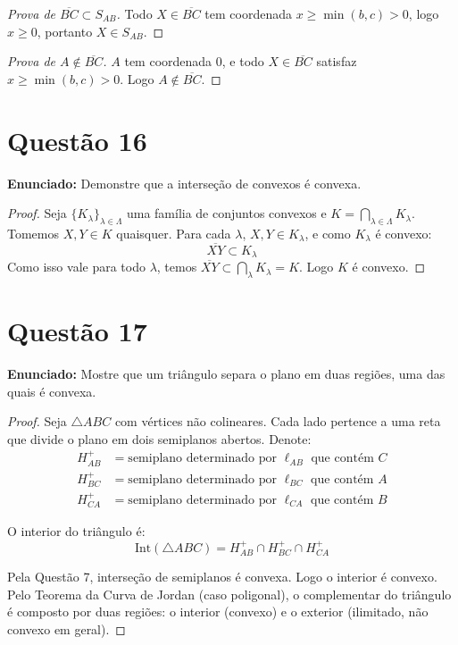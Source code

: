 \documentclass[12pt,a4paper]{article}
\begin{document}
\begin{proof}[Prova de $\overline{BC} \subset S_{AB}$]
Todo $X \in \overline{BC}$ tem coordenada $x \geq \min(b,c) > 0$, logo $x \geq 0$, portanto $X \in S_{AB}$.
\end{proof}

\begin{proof}[Prova de $A \notin \overline{BC}$]
$A$ tem coordenada $0$, e todo $X \in \overline{BC}$ satisfaz $x \geq \min(b,c) > 0$. Logo $A \notin \overline{BC}$.
\end{proof}

\section*{Quest\~ao 16}

\textbf{Enunciado:} Demonstre que a interse\c{c}\~ao de convexos \'e convexa.

\begin{proof}
Seja $\{K_\lambda\}_{\lambda \in \Lambda}$ uma fam\'ilia de conjuntos convexos e $K = \bigcap_{\lambda \in \Lambda} K_\lambda$. Tomemos $X, Y \in K$ quaisquer. Para cada $\lambda$, $X, Y \in K_\lambda$, e como $K_\lambda$ \'e convexo:
$$\overline{XY} \subset K_\lambda$$
Como isso vale para todo $\lambda$, temos $\overline{XY} \subset \bigcap_\lambda K_\lambda = K$. Logo $K$ \'e convexo.
\end{proof}

\section*{Quest\~ao 17}

\textbf{Enunciado:} Mostre que um tri\^angulo separa o plano em duas regi\~oes, uma das quais \'e convexa.

\begin{proof}
Seja $\triangle ABC$ com v\'ertices n\~ao colineares. Cada lado pertence a uma reta que divide o plano em dois semiplanos abertos. Denote:
\begin{align*}
H_{AB}^+ &= \text{semiplano determinado por } \ell_{AB} \text{ que cont\'em } C\\
H_{BC}^+ &= \text{semiplano determinado por } \ell_{BC} \text{ que cont\'em } A\\
H_{CA}^+ &= \text{semiplano determinado por } \ell_{CA} \text{ que cont\'em } B
\end{align*}

O interior do tri\^angulo \'e:
$$\mathrm{Int}(\triangle ABC) = H_{AB}^+ \cap H_{BC}^+ \cap H_{CA}^+$$

Pela Quest\~ao 7, interse\c{c}\~ao de semiplanos \'e convexa. Logo o interior \'e convexo. Pelo Teorema da Curva de Jordan (caso poligonal), o complementar do tri\^angulo \'e composto por duas regi\~oes: o interior (convexo) e o exterior (ilimitado, n\~ao convexo em geral).
\end{proof}
\end{document}
